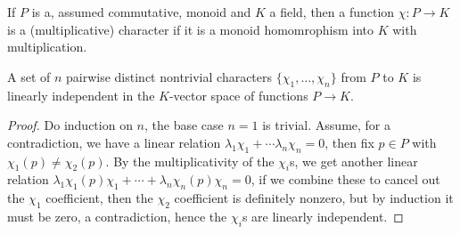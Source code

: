 \documentclass{article}
\begin{document}
If $P$ is a, assumed commutative, monoid and $K$ a field, then a function $\chi:P\rightarrow K$ is a (multiplicative) character if it is a monoid homomrophism into $K$ with multiplication.

\begin{lemma}
    A set of $n$ pairwise distinct nontrivial characters $\{\chi_1,\ldots, \chi_n\}$ from $P$ to $K$ is linearly independent in the $K$-vector space of functions $P\rightarrow K$.\begin{proof}
        Do induction on $n$, the base case $n=1$ is trivial. Assume, for a contradiction, we have a linear relation $\lambda_1\chi_1 + \cdots \lambda_n\chi_n = 0$, then fix $p\in P$ with $\chi_1(p)\neq \chi_2(p)$. By the multiplicativity of the $\chi_i$s, we get another linear relation $\lambda_1\chi_1(p)\chi_1 + \cdots + \lambda_n\chi_n(p)\chi_n = 0$, if we combine these to cancel out the $\chi_1$ coefficient, then the $\chi_2$ coefficient is definitely nonzero, but by induction it must be zero, a contradiction, hence the $\chi_i$s are linearly independent.
    \end{proof}
\end{lemma}
\end{document}
